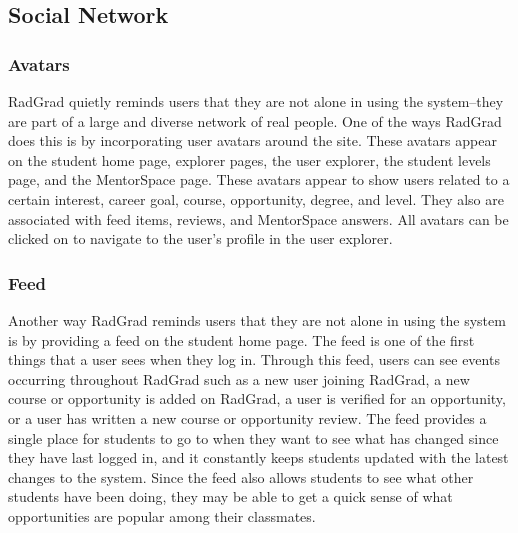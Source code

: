 \subsection{Social Network}
\subsubsection{Avatars}
RadGrad quietly reminds users that they are not alone in using the system--they are part of a large and diverse network of real people. One of the ways RadGrad does this is by incorporating user avatars around the site. These avatars appear on the student home page, explorer pages, the user explorer, the student levels page, and the MentorSpace page. These avatars appear to show users related to a certain interest, career goal, course, opportunity, degree, and level. They also are associated with feed items, reviews, and MentorSpace answers. All avatars can be clicked on to navigate to the user's profile in the user explorer.  

\subsubsection{Feed}
Another way RadGrad reminds users that they are not alone in using the system is by providing a feed on the student home page. The feed is one of the first things that a user sees when they log in. Through this feed, users can see events occurring throughout RadGrad such as a new user joining RadGrad, a new course or opportunity is added on RadGrad, a user is verified for an opportunity, or a user has written a new course or opportunity review. The feed provides a single place for students to go to when they want to see what has changed since they have last logged in, and it constantly keeps students updated with the latest changes to the system. Since the feed also allows students to see what other students have been doing, they may be able to get a quick sense of what opportunities are popular among their classmates.

